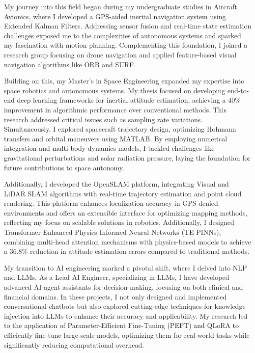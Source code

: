 \documentclass[a4,20pt]{article}
\begin{document}
\begin{large} 

My journey into this field began during my undergraduate studies in Aircraft Avionics, where I developed a GPS-aided inertial navigation system using Extended Kalman Filters. Addressing sensor fusion and real-time state estimation challenges exposed me to the complexities of autonomous systems and sparked my fascination with motion planning. Complementing this foundation, I joined a research group focusing on drone navigation and applied feature-based visual navigation algorithms like ORB and SURF. 

Building on this, my Master’s in Space Engineering expanded my expertise into space robotics and autonomous systems. My thesis focused on developing end-to-end deep learning frameworks for inertial attitude estimation, achieving a 40\% improvement in algorithmic performance over conventional methods. This research addressed critical issues such as sampling rate variations. Simultaneously, I explored spacecraft trajectory design, optimizing Hohmann transfers and orbital maneuvers using MATLAB. By employing numerical integration and multi-body dynamics models, I tackled challenges like gravitational perturbations and solar radiation pressure, laying the foundation for future contributions to space autonomy.



Additionally, I developed the OpenSLAM platform, integrating Visual and LiDAR SLAM algorithms with real-time trajectory estimation and point cloud rendering. This platform enhances localization accuracy in GPS-denied environments and offers an extensible interface for optimizing mapping methods, reflecting my focus on scalable solutions in robotics. Additionally, I designed Transformer-Enhanced Physics-Informed Neural Networks (TE-PINNs), combining multi-head attention mechanisms with physics-based models to achieve a 36.8\% reduction in attitude estimation errors compared to traditional methods.








My transition to AI engineering marked a pivotal shift, where I delved into NLP and LLMs. As a Lead AI Engineer, specializing in LLMs, I have developed advanced AI-agent assistants for decision-making, focusing on both clinical and financial domains. In these projects, I not only designed and implemented conversational chatbots but also explored cutting-edge techniques for knowledge injection into LLMs to enhance their accuracy and applicability. My research led to the application of Parameter-Efficient Fine-Tuning (PEFT) and QLoRA to efficiently fine-tune large-scale models, optimizing them for real-world tasks while significantly reducing computational overhead.


\end{large}
\end{document}
